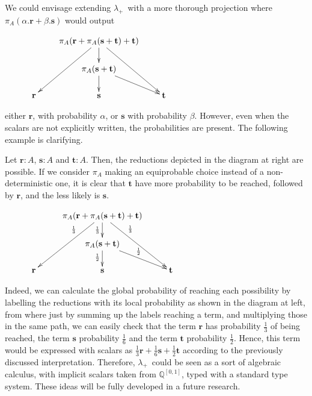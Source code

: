 \documentclass[final,copyright,creativecommons]{eptcs}
\newcommand{\OurCalculus}{\ensuremath{\lambda_+}}
\newcommand{\ve}[1]{\ensuremath{\mathrm{\textbf{#1}}}}
\theoremstyle{definition}
\begin{document}
We could envisage extending \OurCalculus\ with a more thorough projection where $\pi_A(\alpha.\ve r+\beta.\ve s)$ would output
\begin{wrapfigure}{r}{0.37\textwidth}
  \begin{center}\vspace{-0.2in}
$\xymatrix@C=5ex@R=4ex{
   & \pi_A(\ve r+\pi_A(\ve s+\ve t)+\ve t) \ar[ddl] \ar[ddr]\ar[d] & \\
    & \pi_A(\ve s+\ve t)\ar[d] \ar[dr] & \\
   \ve r & \ve s & \ve t
  }$\end{center}
\end{wrapfigure}
either $\ve r$, with probability $\alpha$, or $\ve s$ with probability $\beta$. However, even when the scalars are not explicitly written, the probabilities are present. The following example is clarifying.

Let $\ve r:A$, $\ve s:A$ and $\ve t:A$. Then, the reductions depicted in the diagram at right are possible. If we consider $\pi_A$ making an equiprobable choice instead of a non-deterministic one, it is clear that $\ve t$ have more probability to be reached, followed by $\ve r$, and the less likely is $\ve s$.

\begin{wrapfigure}{L}{0.39\textwidth}
  \begin{center}\vspace{-0.2in}
$\xymatrix@C=6ex@R=4ex{
   & \pi_A(\ve r+\pi_A(\ve s+\ve t)+\ve t) \ar[ddl]_(.36){\frac{1}{3}} \ar[ddr]^(.35){\frac{1}{3}} \ar[d]_{\frac{1}{3}} & \\
    & \pi_A(\ve s+\ve t)\ar[d]_{\frac{1}{2}} \ar[dr]^{\frac{1}{2}} & \\
   \ve r & \ve s & \ve t
  }$
    \end{center}
\end{wrapfigure}

Indeed, we can calculate the global probability of reaching each possibility by labelling the reductions with its local probability as shown in the diagram at left, from where just by summing up the labels reaching a term, and multiplying those in the same path, we can easily check that the term $\ve r$ has probability $\frac{1}{3}$ of being reached, the term $\ve s$ probability $\frac{1}{6}$ and the term $\ve t$ probability $\frac{1}{2}$.
Hence, this term would be expressed with
scalars as $\frac{1}{3}\ve r+\frac{1}{6}\ve s+\frac{1}{2}\ve t$ according to the
previously discussed interpretation.
Therefore, \OurCalculus\ could be seen as a sort of algebraic calculus, with implicit scalars taken from $\mathbb{Q}^{[0,1]}$, typed with a standard type system. These ideas will be fully developed in a future research.
\end{document}
